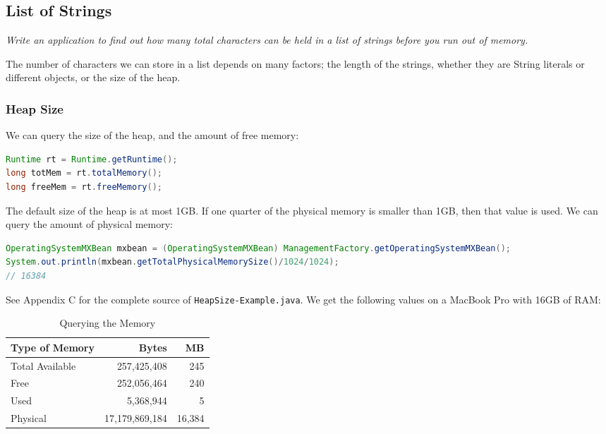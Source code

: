 \subsection{List of Strings}
\textit{Write an application to find out how many total characters can be held in a list of strings before you run out of memory.}

The number of characters we can store in a list depends on many factors; the length of the strings, whether they are String literals or different objects, or the size of the heap. 

\subsubsection{Heap Size}

We can query the size of the heap, and the amount of free memory:
\begin{lstlisting}[language=Java]
Runtime rt = Runtime.getRuntime();
long totMem = rt.totalMemory();
long freeMem = rt.freeMemory();
\end{lstlisting}

The default size of the heap is at most 1GB. If one quarter of the physical memory is smaller than 1GB, then that value is used\cite{gcergo}. We can query the amount of physical memory:
\begin{lstlisting}[language=Java]
OperatingSystemMXBean mxbean = (OperatingSystemMXBean) ManagementFactory.getOperatingSystemMXBean();
System.out.println(mxbean.getTotalPhysicalMemorySize()/1024/1024);
// 16384
\end{lstlisting}
See Appendix C for the complete source of \texttt{HeapSize\hyp{}Example.java}.
We get the following values on a MacBook Pro with 16GB of RAM:

\begin{table}[!htb]
\centering
\begin{tabulary}{\columnwidth}{ | l | r | r |}
\hline
\textbf{Type of Memory} &  \textbf{Bytes}& \textbf{MB} \\ \hline 
Total Available & 257,425,408 & 245 \\ \hline
Free & 252,056,464 & 240 \\ \hline
Used & 5,368,944 & 5 \\ \hline
Physical & 17,179,869,184 & 16,384 \\ \hline
\end{tabulary}
\caption{Querying the Memory}\label{tab:memory}
\end{table}

